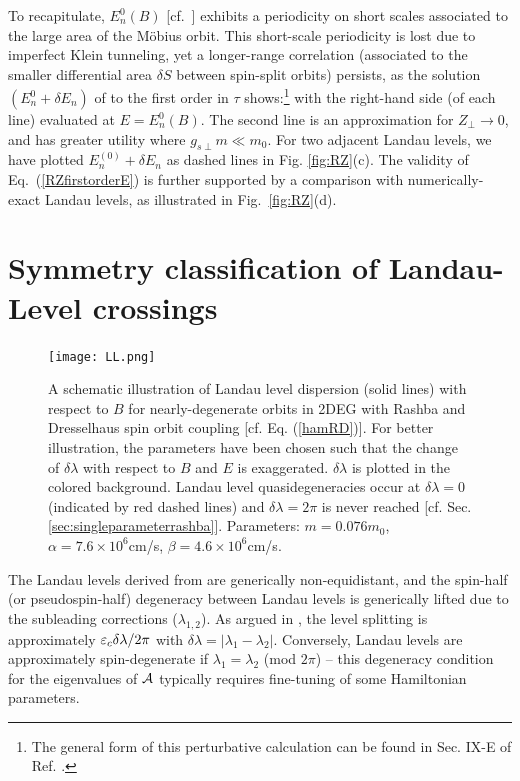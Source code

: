\documentclass[aps, showpacs, twocolumn, notitlepage, superscriptaddress]{revtex4-1}
\begin{document}
To recapitulate, $E_n^0(B)$ [cf.\ ] exhibits a periodicity on short scales associated to the large area of the M\"obius orbit. This short-scale periodicity is lost due to  imperfect Klein tunneling, yet a longer-range correlation (associated to the smaller differential area $\delta S$ between spin-split orbits) persists, as the solution $(E_n^0+\delta E_n)$ of  to the first order in $\tau$ shows:\footnote{The general form of this perturbative calculation can be found in Sec. IX-E of Ref. .} 
with the right-hand side (of each line) evaluated at $E{=}E_n^0(B)$. The second line is an approximation for $Z_{\perp}{\rightarrow}0$, and has greater utility where $g_{s\perp}m{\ll}m_0$. For two adjacent Landau levels, we have plotted $E_n^{(0)}+\delta E_n$ as dashed lines in Fig. \ref{fig:RZ}(c). The validity of Eq.\ (\ref{RZfirstorderE}) is further supported by a comparison with numerically-exact Landau levels, as illustrated in Fig.\ \ref{fig:RZ}(d).


\section{Symmetry classification of Landau-Level crossings}\label{sec:llquasideg}

\begin{figure}
\texttt{[image: LL.png]}
\caption{A schematic illustration of Landau level dispersion (solid lines) with respect to $B$ for nearly-degenerate orbits in 2DEG with Rashba and Dresselhaus spin orbit coupling [cf. Eq. (\ref{hamRD})]. For better illustration, the parameters have been chosen such that the change of $\delta\lambda$ with respect to $B$ and $E$ is exaggerated. $\delta\lambda$ is plotted in the colored background. Landau level quasidegeneracies occur at $\delta\lambda=0$ (indicated by red dashed lines) and $\delta\lambda=2\pi$ is never reached [cf. Sec. \ref{sec:singleparameterrashba}]. Parameters: $m=0.076m_0$, $\alpha=7.6\times 10^6$cm/s, $\beta=4.6\times 10^6$cm/s.\label{fig:LL}}
\end{figure}

The Landau levels derived from  are generically non-equidistant, and the spin-half (or pseudospin-half) degeneracy between Landau levels is generically lifted due to the subleading corrections ($\lambda_{1,2}$). As argued in , the level splitting is approximately $\varepsilon_c\delta \lambda/2\pi$ with $\delta \lambda=|\lambda_1-\lambda_2|$. Conversely, Landau levels are approximately spin-degenerate if $\lambda_1{=}\lambda_2$ (mod $2\pi$) -- this degeneracy condition for the eigenvalues of ${\cal A}$ typically requires fine-tuning of some Hamiltonian parameters.  
\end{document}
